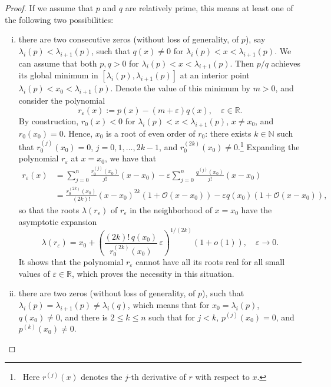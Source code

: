 \documentclass[reqno,11pt]{amsart}
\theoremstyle{remark}
\newcommand{\R}{\mathbb{R}}
\newcommand{\N}{\mathbb{N}}
\begin{document}
\begin{proof}
If we assume that $p$ and $q$ are relatively prime, this means at least one of the following two possibilities:
\begin{enumerate}[(i)]
    \item there are two consecutive zeros (without loss of generality, of $p$), say $\lambda_i(p)<\lambda_{i+1}(p)$, such that $q(x)\neq 0$ for $\lambda_i(p)<x<\lambda_{i+1}(p)$. We can assume that both $p,q>0$ for $\lambda_i(p)<x<\lambda_{i+1}(p)$. Then $p/q$ achieves its global minimum in $[\lambda_i(p),\lambda_{i+1}(p)]$ at an interior point $\lambda_i(p)<x_0<\lambda_{i+1}(p)$. Denote the value of this minimum by $m>0$, and consider the polynomial 
$$
r_\varepsilon(x):= p(x) - (m+\varepsilon) q(x), \quad \varepsilon\in \R.
$$
By construction, $r_0(x)<0$ for $\lambda_i(p)<x<\lambda_{i+1}(p)$, $x\neq x_0$, and $r_0(x_0)=0$. Hence, $x_0$ is a root of even order of $r_0$: there exists $k\in \N$ such that $r_0^{(j)}(x_0)=0$, $j=0, 1, \dots, 2k-1$, and $r_0^{(2k)}(x_0)\neq 0$.\footnote{\, Here $r^{(j)}(x)$ denotes the $j$-th derivative of $r$ with respect to $x$.} Expanding the polynomial $r_\varepsilon$ at $x=x_0$, we have that
\begin{align*}
r_\varepsilon(x) & = \sum_{j=0}^n \frac{r_0^{(j)}(x_0)}{j!}(x-x_0) - \varepsilon \sum_{j=0}^n \frac{q^{(j)}(x_0)}{j!}(x-x_0)  \\
&= \frac{r_0^{(2k)}(x_0)}{(2k)!}(x-x_0)^{2k} \left( 1+ \mathcal O(x-x_0)\right) - \varepsilon q(x_0) \left( 1+ \mathcal O(x-x_0)\right),
\end{align*}
 so that the roots $\lambda(r_\varepsilon)$ of $r_\varepsilon$ in the neighborhood of $x=x_0$ have the asymptotic expansion
$$
\lambda(r_\varepsilon) = x_0 + \left(\frac{(2k)!\,  q(x_0)}{r_0^{(2k)}(x_0)} \, \varepsilon \right)^{1/(2k)} \left( 1+ o(1)\right), \quad \varepsilon\to 0.
$$
It shows that the polynomial $r_\varepsilon$ cannot have all its roots real for all small values of $\varepsilon\in \R$, which proves the necessity in this situation.

\item there are two zeros (without loss of generality, of $p$), such that  $\lambda_i(p)=\lambda_{i+1}(p)\neq \lambda_i(q)$, which means that for $x_0=\lambda_i(p)$, $q(x_0)\neq 0$, and there is $2\le k\le n$ such that for $j<k$, $p^{(j)}(x_0)= 0$, and $p^{(k)}(x_0)\ne 0$. 


\end{enumerate}
\end{proof}
\end{document}
